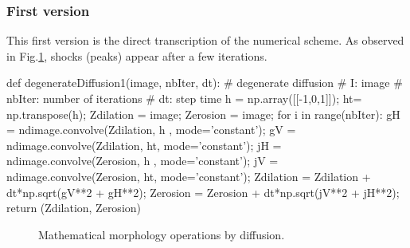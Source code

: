\subsubsection{First version}
 This first version is the direct transcription of the numerical scheme. As observed in Fig.\ref{fig:pde:python:dd1}, shocks (peaks) appear after a few iterations.
\begin{python}
def degenerateDiffusion1(image, nbIter, dt):
    # degenerate diffusion
    # I: image
    # nbIter: number of iterations
    # dt: step time
    h = np.array([[-1,0,1]]);
    ht= np.transpose(h);
    Zdilation = image;
    Zerosion  = image;
    for i in range(nbIter):
        gH = ndimage.convolve(Zdilation, h , mode='constant');
        gV = ndimage.convolve(Zdilation, ht, mode='constant');
        jH = ndimage.convolve(Zerosion, h , mode='constant');
        jV = ndimage.convolve(Zerosion, ht, mode='constant');
        Zdilation = Zdilation + dt*np.sqrt(gV**2 + gH**2);
        Zerosion  = Zerosion + dt*np.sqrt(jV**2 + jH**2);
    return (Zdilation, Zerosion)
\end{python}

\begin{figure}[H]
 \centering\caption{Mathematical morphology operations by diffusion.}
 \hspace{1.5cm}
%
\vspace*{-10pt}%
\label{fig:pde:python:dd1}
\end{figure}


